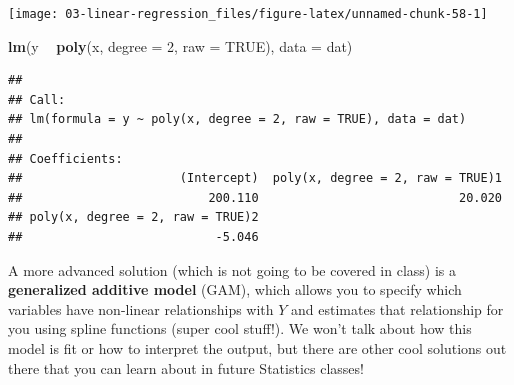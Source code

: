 \documentclass[
]{book}
\newenvironment{Shaded}{\begin{snugshade}}{\end{snugshade}}
\newcommand{\DataTypeTok}[1]{\textcolor[rgb]{0.13,0.29,0.53}{#1}}
\newcommand{\DecValTok}[1]{\textcolor[rgb]{0.00,0.00,0.81}{#1}}
\newcommand{\KeywordTok}[1]{\textcolor[rgb]{0.13,0.29,0.53}{\textbf{#1}}}
\newcommand{\NormalTok}[1]{#1}
\newcommand{\OperatorTok}[1]{\textcolor[rgb]{0.81,0.36,0.00}{\textbf{#1}}}
\newcommand{\OtherTok}[1]{\textcolor[rgb]{0.56,0.35,0.01}{#1}}
\newcommand{\StringTok}[1]{\textcolor[rgb]{0.31,0.60,0.02}{#1}}
\begin{document}
\begin{Shaded}
\end{Shaded}

\begin{center}\texttt{[image: 03-linear-regression\_files/figure-latex/unnamed-chunk-58-1]} \end{center}

\begin{Shaded}
\begin{Highlighting}[]
\KeywordTok{lm}\NormalTok{(y }\OperatorTok{~}\StringTok{ }\KeywordTok{poly}\NormalTok{(x, }\DataTypeTok{degree =} \DecValTok{2}\NormalTok{, }\DataTypeTok{raw =} \OtherTok{TRUE}\NormalTok{), }\DataTypeTok{data =}\NormalTok{ dat)}
\end{Highlighting}
\end{Shaded}

\begin{verbatim}
## 
## Call:
## lm(formula = y ~ poly(x, degree = 2, raw = TRUE), data = dat)
## 
## Coefficients:
##                      (Intercept)  poly(x, degree = 2, raw = TRUE)1  
##                          200.110                            20.020  
## poly(x, degree = 2, raw = TRUE)2  
##                           -5.046
\end{verbatim}

A more advanced solution (which is not going to be covered in class) is a \textbf{generalized additive model} (GAM), which allows you to specify which variables have non-linear relationships with \(Y\) and estimates that relationship for you using spline functions (super cool stuff!). We won't talk about how this model is fit or how to interpret the output, but there are other cool solutions out there that you can learn about in future Statistics classes!
\end{document}
